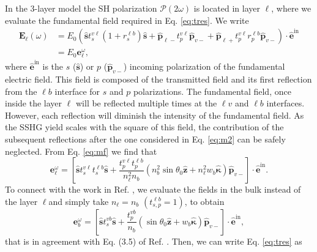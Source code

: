 In the 3-layer model the SH polarization $\boldsymbol{\mathcal{P}}(2\omega)$ is
located in layer $\ell$, where we evaluate the fundamental field required in Eq.
\eqref{eq:tres}. We write
\begin{equation}\label{eq:m2}
\begin{split}
\mathbf{E}_{\ell}(\omega) 
&= E_{0}
\left(
  \hat{\mathbf{s}} t^{v\ell}_{s}(1+r^{\ell b}_{s})\hat{\mathbf{s}}
+ \hat{\mathbf{p}}_{\ell-}t^{v\ell}_{p}\hat{\mathbf{p}}_{v-}
+ \hat{\mathbf{p}}_{\ell+}t^{v\ell}_{p}r^{\ell b}_{p}\hat{\mathbf{p}}_{v-}
\right)
\cdot\hat{\mathbf{e}}^{\mathrm{in}}\\
&= E_{0}\mathbf{e}^\omega_{\ell},
\end{split}
\end{equation} 
where $\hat{\mathbf{e}}^{\mathrm{in}}$ is the $s$ ($\hat{\mathbf{s}}$) or $p$
($\hat{\mathbf{p}}_{v-}$) incoming polarization of the fundamental electric
field. This field is composed of the transmitted field and its first reflection
from the $\ell b$ interface for $s$ and $p$ polarizations. The fundamental
field, once inside the layer $\ell$ will be reflected multiple times at the
$\ell v$ and $\ell b$ interfaces. However, each reflection will diminish the
intensity of the fundamental field. As the SSHG yield scales with the square of
this field, the contribution of the subsequent reflections after the one
considered in Eq. \eqref{eq:m2} can be safely neglected. From Eq. \eqref{eq:mf}
we find that
\begin{equation}\label{eq:m12}
\mathbf{e}^{\omega}_{\ell} =
\left[
  \hat{\mathbf{s}}t_{s}^{v\ell}t_{s}^{\ell b}\hat{\mathbf{s}} 
+ \frac{t^{v\ell}_{p}t^{\ell b}_{p}}{n^{2}_{\ell} n_{b}}
\left(
  n^{2}_{b}\sin\theta_{0}\hat{\mathbf{z}} 
+ n^{2}_{\ell} w_b\hat{\boldsymbol{\kappa}}
\right)
\hat{\mathbf{p}}_{v-}
\right]
\cdot\hat{\mathbf{e}}^{\mathrm{in}}.  
\end{equation}  
To connect with the work in Ref. \cite{mizrahiJOSA88}, we evaluate the fields in
the bulk instead of the layer $\ell$and simply take $n_{\ell} = n_{b}$
$(t^{\ell b}_{s,p} = 1)$, to obtain
\begin{equation}\label{eq:m13}
\mathbf{e}^{\omega}_{b} =
\left[
  \hat{\mathbf{s}}t_{s}^{vb}\hat{\mathbf{s}}
+ \frac{t^{vb}_{p}}{n_{b}}
\left(\sin\theta_{0}\hat{\mathbf{z}} + w_b\hat{\boldsymbol{\kappa}}\right) 
\hat{\mathbf{p}}_{v-}
\right]
\cdot\hat{\mathbf{e}}^{\mathrm{in}},  
\end{equation} 
that is in agreement with Eq. (3.5) of Ref. \cite{mizrahiJOSA88}. Then, we can
write Eq. \eqref{eq:tres} as
